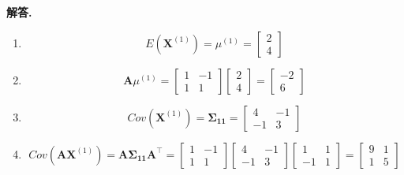 \documentclass[12pt, a4paper, oneside]{ctexart}
\newenvironment{solution}{\par\noindent\textbf{解答. }}{\par}
\begin{document}
\begin{solution}
    \begin{enumerate}[label=(\alph*)]
        \item 
        \[
            E(\mathbf{X}^{(1)})=\mu^{(1)}
            =\begin{bmatrix}
                2\\
                4
            \end{bmatrix}
        \]
        \item 
        \[
            \mathbf{A}\mu^{(1)}=
            \begin{bmatrix}
                1 & -1\\
                1 & 1
            \end{bmatrix}
            \begin{bmatrix}
                2\\
                4
            \end{bmatrix}=
            \begin{bmatrix}
                -2\\
                6
            \end{bmatrix}
        \]
        \item
        \[
            Cov(\mathbf{X}^{(1)})=\bm{\Sigma_{11}}=
            \begin{bmatrix}
                4 & -1 \\
                -1 & 3
            \end{bmatrix}
        \] 
        \item 
        \[
            Cov(\mathbf{A}\mathbf{X}^{(1)})=\mathbf{A}\bm{\Sigma_{11}}\mathbf{A^\top}=
            \begin{bmatrix}
                1 & -1\\
                1 & 1
            \end{bmatrix}
            \begin{bmatrix}
                4 & -1 \\
                -1 & 3
            \end{bmatrix}
            \begin{bmatrix}
                1 & 1\\
                -1 & 1
            \end{bmatrix}
            =\begin{bmatrix}
                9 & 1 \\
                1 & 5
            \end{bmatrix}
\]
\end{enumerate}
\end{solution}
\end{document}
